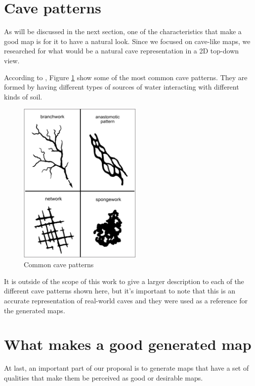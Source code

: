 \section{Cave patterns}

As will be discussed in the next section, one of the characteristics that make a good map is for it to have a natural look. Since we focused on cave-like maps, we researched for what would be a natural cave representation in a 2D top-down view.

According to \cite{audra:2011}, Figure \ref{fig:cave_patterns} show some of the most common cave patterns. They are formed by having different types of sources of water interacting with different kinds of soil.

\begin{figure}[h]
    \caption{Common cave patterns}
    \centerline{\includegraphics[width=6cm]{images/proposal/cave_patterns.png}}
    \label{fig:cave_patterns}
\end{figure}

It is outside of the scope of this work to give a larger description to each of the different cave patterns shown here, but it's important to note that this is an accurate representation of real-world caves and they were used as a reference for the generated maps.

\section{What makes a good generated map}
\label{sec:goodmap}

At last, an important part of our proposal is to generate maps that have a set of qualities that make them be perceived as good or desirable maps.

